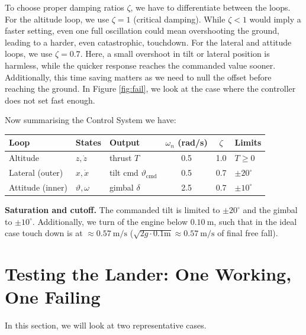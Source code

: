 \documentclass[11pt]{article}
\begin{document}
To choose proper damping ratios $\zeta$, we have to differentiate between the loops. For the altitude loop, we use $\zeta = 1$ (critical damping). While $\zeta < 1$ would imply a faster setting, even one full oscillation could mean overshooting the ground, leading to a harder, even catastrophic, touchdown.
For the lateral and attitude loops, we use $\zeta = 0.7$. Here, a small overshoot in tilt or lateral position is harmless, while the quicker response reaches the commanded value sooner. Additionally, this time saving matters as we need to null the offset before reaching the ground. In Figure \ref{fig:fail}, we look at the case where the controller does not set fast enough. 

Now summarising the Control System we have:
\begin{table}[H] \centering\small
\begin{tabular}{lllccl}
\hline
Loop & States & Output & $\omega_n$ (rad/s) & $\zeta$ & Limits\\
\hline
Altitude        & $z,\dot z$        & thrust $T$                        & 0.5 & 1.0 & $T \ge 0$\\
Lateral (outer) & $x,\dot x$        & tilt cmd $\vartheta_{\mathrm{cmd}}$ & 0.5 & 0.7 & $\pm 20^\circ$\\
Attitude (inner)& $\vartheta,\omega$ & gimbal $\delta$                  & 2.5 & 0.7 & $\pm 10^\circ$\\
\hline
\end{tabular}
\end{table}


\textbf{Saturation and cutoff.} The commanded tilt is limited to $\pm 20^\circ$ and the gimbal to $\pm 10^\circ$. Additionally, we turn of the engine below $0.10~\mathrm{m}$, such that in the ideal case touch down is at $\approx 0.57~\mathrm{m/s}$ ($\sqrt{2g\cdot 0.1\text{m}}\approx 0.57~\mathrm{m/s}$ of final free fall).   



\section*{Testing the Lander: One Working, One Failing}

In this section, we will look at two representative cases. 
\end{document}

